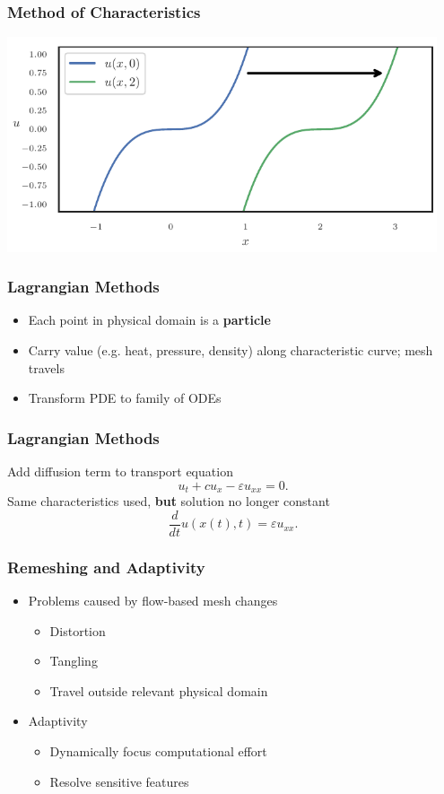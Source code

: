\documentclass{beamer}
\newcommand{\eps}{\varepsilon}
\begin{document}
\begin{frame}
\frametitle{Method of Characteristics}
\begin{center}
\includegraphics[width=0.95\textwidth]
                {../images/solution-transfer/simple_transport.pdf}
\end{center}
\end{frame}

\begin{frame}
\frametitle{Lagrangian Methods}
\begin{itemize}
\pause
\item Each point in physical domain is a \textbf{particle}
\pause
\item Carry value (e.g. heat, pressure, density) along characteristic curve;
  mesh travels
\pause
\item Transform PDE to family of ODEs
\end{itemize}
\end{frame}

\begin{frame}
\frametitle{Lagrangian Methods}
Add diffusion term to transport equation
\begin{equation*}
u_t + c u_x - \eps u_{xx} = 0.
\end{equation*}
\pause
Same characteristics used, \textbf{but} solution no
longer constant
\pause
\begin{equation*}
\frac{d}{dt} u(x(t), t) = \eps u_{xx}.
\end{equation*}
\end{frame}

\begin{frame}
\frametitle{Remeshing and Adaptivity}
\begin{itemize}
\item Problems caused by flow-based mesh changes
\begin{itemize}
\pause
\item Distortion
\pause
\item Tangling
\pause
\item Travel outside relevant physical domain
\end{itemize}
\pause
\item Adaptivity
\begin{itemize}
\pause
\item Dynamically focus computational effort
\pause
\item Resolve sensitive features
\end{itemize}
\end{itemize}
\end{frame}
\end{document}
